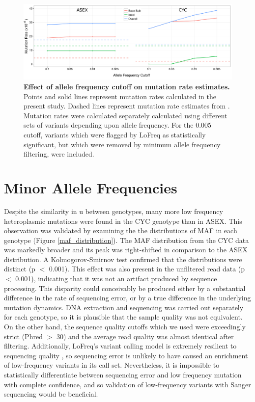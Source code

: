 \documentclass[12pt,twoside]{reedthesis}
\begin{document}
\begin{figure}[h!]
    \begin{center}
        \includegraphics[width=1\textwidth]{../figures/allele_freq_cutoff.png}
    \end{center}
    \caption[Effect of allele frequency cutoff on mutation rate estimates]{\textbf{Effect of allele frequency cutoff on mutation rate estimates.} Points and solid lines represent mutation rates calculated in the present study. Dashed lines represent mutation rate estimates from \cite{xu_high_2012}. Mutation rates were calculated separately calculated using different sets of variants depending upon allele frequency. For the 0.005 cutoff, variants which were flagged by LoFreq as statistically significant, but which were removed by minimum allele frequency filtering, were included.}
    \label{allele_freq_cutoff}
\end{figure}

\section{Minor Allele Frequencies}
Despite the similarity in \gls{u} between genotypes, many more low frequency heteroplasmic mutations were found in the \gls{CYC} genotype than in \gls{ASEX}.
This observation was validated by examining the the distributions of \gls{MAF} in each genotype (Figure \ref{maf_distribution}).
The \gls{MAF} distribution from the \gls{CYC} data was markedly broader and its peak was right-shifted in comparison to the \gls{ASEX} distribution.
A Kolmogorov-Smirnov test confirmed that the distributions were distinct (p $<$ 0.001).
This effect was also present in the unfiltered read data (p $<$ 0.001), indicating that it was not an artifact produced by sequence processing. 
This disparity could conceivably be produced either by a substantial difference in the rate of sequencing error, or by a true difference in the underlying mutation dynamics.
DNA extraction and sequencing was carried out separately for each genotype, so it is plausible that the sample quality was not equivalent.
On the other hand, the sequence quality cutoffs which we used were exceedingly strict (Phred $>$ 30) and the average read quality was almost identical after filtering. 
Additionally, LoFreq's variant calling model is extremely resilient to sequencing quality \citep{wilm_lofreq:_2012, huang_evaluation_2015}, so sequencing error is unlikely to have caused an enrichment of low-frequency variants in its call set. 
Nevertheless, it is impossible to statistically differentiate between sequencing error and low frequency mutation with complete confidence, and so validation of low-frequency variants with Sanger sequencing would be beneficial. 
\end{document}
